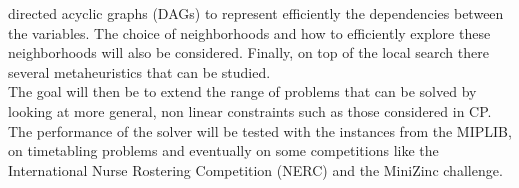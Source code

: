 \documentclass[a4paper,11pt]{article}
\begin{document}
directed acyclic graphs (DAGs) to represent efficiently the dependencies between the variables. The choice of 
neighborhoods and how to efficiently explore these neighborhoods will also be considered. Finally, on top of the local 
search 
there several metaheuristics that can be studied. \medskip \\   
The goal will then be to extend the range of problems that can be solved by looking at more general, non linear 
constraints such as those considered in CP. \medskip \\ 
The performance of the solver will be tested with the instances from the MIPLIB, on timetabling problems and eventually 
on some competitions like the International Nurse Rostering Competition (NERC) and the MiniZinc challenge. 
\end{document}
